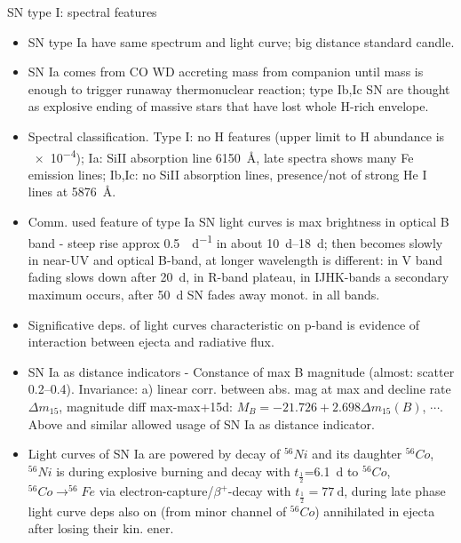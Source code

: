 \begin{frame}{SN type I: spectral features}
    \begin{itemize}
\item SN type Ia have same spectrum and light curve; big distance standard candle.
        \item SN Ia comes from CO WD accreting mass from companion until mass is enough to trigger runaway thermonuclear reaction; type Ib,Ic SN are thought as explosive ending of massive stars that have lost whole H-rich envelope.
        \item Spectral classification. Type I: no H features (upper limit to H abundance is \SI{e-4}{\sloarmass}); Ia: SiII absorption line \SI{6150}{\angstrom}, late spectra shows many Fe emission lines; Ib,Ic: no SiII absorption lines, presence/not of strong He I lines at \SI{5876}{\angstrom}.
        \item Comm. used feature of type Ia SN light curves is max brightness in optical B band - steep rise approx \SI{0.5}{\mag\per\day} in about \SIrange{10}{18}{\day}; then becomes slowly in near-UV and optical B-band, at longer wavelength is different: in V band fading slows down after \SI{20}{\day}, in R-band plateau, in IJHK-bands a secondary maximum occurs, after \SI{50}{\day} SN fades away monot. in all bands.
        \item Significative deps. of light curves characteristic on p-band is evidence of interaction between ejecta and radiative flux.
        \item SN Ia as distance indicators - Constance of max B magnitude (almost: scatter \SIrange{0.2}{0.4}{\mag}). Invariance: a) linear corr. between abs. mag at max and decline rate $\Delta m_{15}$, magnitude diff max-max+15d: $M_B=-21.726+2.698\Delta m_{15}(B)$, $\cdots$. Above and similar allowed usage of SN Ia as distance indicator.
    \item Light curves of SN Ia are powered by decay of $^56Ni$ and its daughter $^{56}Co$, $^{56}Ni$ is during explosive burning and decay with $t_{\frac{1}{2}}$=\SI{6.1}{\day} to $^{56}Co$, $^{56}Co\to ^{56}Fe$ via electron-capture/$\beta^+$-decay with $t_{\frac{1}{2}}=\SI{77}{\day}$, during late phase light curve deps also on \APelectron (from minor channel of $^{56}Co$) annihilated in ejecta after losing their kin. ener.
    \end{itemize}
\end{frame}

